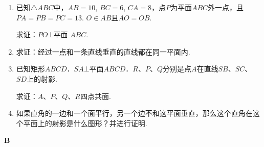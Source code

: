 \begin{enumerate}
\item 已知$\triangle ABC$中，$AB=10$, $BC=6$, $CA=8$，点$P$为平面$ABC$外一点，且$PA=PB=PC=13$. $O\in AB$且$AO=OB$. 

求证：$PO\bot $平面
$ABC$.
\item 求证：经过一点和一条直线垂直的直线都在同一平面内.
\item 已知矩形$ABCD$．$SA\bot $平面$ABCD$．$R$、$P$、$Q$分别是点$A$在直线$SB$、$SC$、$SD$上的射影.

求证：$A$、$P$、$Q$、$R$四点共面.
\item 如果直角的一边和一个面平行，另一个边不和这平面垂直，那么这个直角在这个平面上的射影是什么图形？并进行证明.
\end{enumerate}

\begin{center}
    \bfseries B
\end{center}
